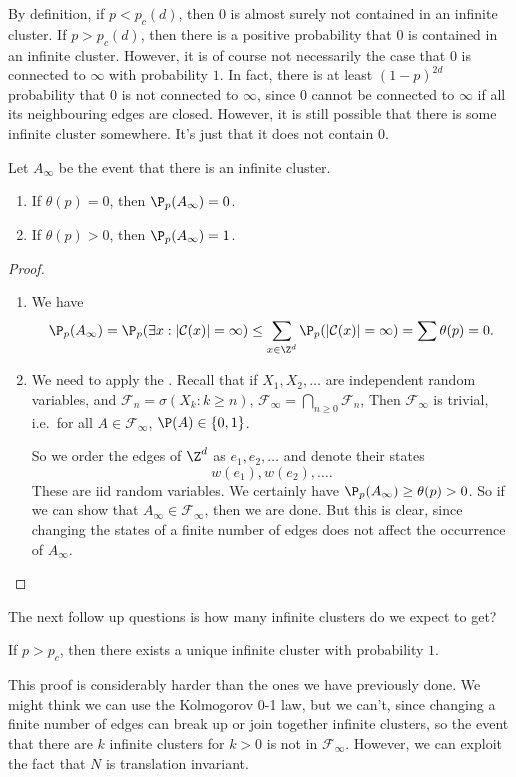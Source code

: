\documentclass[a4paper]{article}
\begin{document}
By definition, if $p < p_c(d)$, then $0$ is almost surely not contained in an infinite cluster. If $p > p_c(d)$, then there is a positive probability that $0$ is contained in an infinite cluster. However, it is of course not necessarily the case that $0$ is connected to $\infty$ with probability $1$. In fact, there is at least $(1 - p)^{2d}$ probability that $0$ is not connected to $\infty$, since $0$ cannot be connected to $\infty$ if all its neighbouring edges are closed. However, it is still possible that there is some infinite cluster somewhere. It's just that it does not contain $0$.

\begin{prop}
  Let $A_\infty$ be the event that there is an infinite cluster.
  \begin{enumerate}
    \item If $\theta(p) = 0$, then $\P_p(A_\infty) = 0$.
    \item If $\theta(p) > 0$, then $\P_p(A_\infty) = 1$.
  \end{enumerate}
\end{prop}

\begin{proof}\leavevmode
  \begin{enumerate}
    \item We have
      \[
        \P_p(A_\infty) = \P_p(\exists x: |\mathcal{C}(x)| = \infty) \leq \sum_{x \in \Z^d} \P_p(|\mathcal{C}(x)| = \infty) = \sum \theta(p) = 0.
      \]
    \item We need to apply the . Recall that if $X_1, X_2, \ldots$ are independent random variables, and $\mathcal{F}_n = \sigma(X_k: k \geq n)$, $\mathcal{F}_\infty = \bigcap_{n \geq 0} \mathcal{F}_n$, Then $\mathcal{F}_\infty$ is trivial, i.e.\ for all $A \in \mathcal{F}_\infty$, $\P(A) \in \{0, 1\}$.

      So we order the edges of $\Z^d$ as $e_1, e_2, \ldots$ and denote their states
      \[
        w(e_1), w(e_2), \ldots.
      \]
      These are iid random variables. We certainly have $\P_p(A_\infty) \geq \theta(p) > 0$. So if we can show that $A_\infty \in \mathcal{F}_\infty$, then we are done. But this is clear, since changing the states of a finite number of edges does not affect the occurrence of $A_\infty$.
  \end{enumerate}
\end{proof}

The next follow up questions is how many infinite clusters do we expect to get?
\begin{thm}
  If $p > p_c$, then there exists a unique infinite cluster with probability $1$.
\end{thm}
This proof is considerably harder than the ones we have previously done. We might think we can use the Kolmogorov 0-1 law, but we can't, since changing a finite number of edges can break up or join together infinite clusters, so the event that there are $k$ infinite clusters for $k > 0$ is not in $\mathcal{F}_\infty$. However, we can exploit the fact that $N$ is translation invariant.
\end{document}
